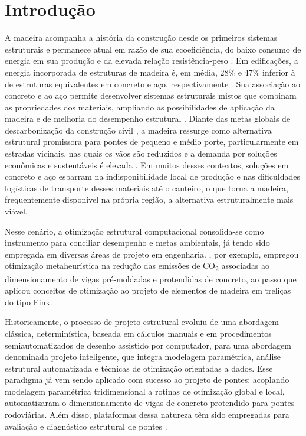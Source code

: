 \section{Introdução}\label{sec:introducao}

A madeira acompanha a história da construção desde os primeiros sistemas estruturais e permanece atual em razão de sua ecoeficiência, do baixo consumo de energia em sua produção e da elevada relação resistência-peso \parencite{FRAGA2025}.
Em edificações, a energia incorporada de estruturas de madeira é, em média, 28\% e 47\% inferior à de estruturas equivalentes em concreto e aço, respectivamente \parencite{Schenk2022}.
Sua associação ao concreto e ao aço permite desenvolver sistemas estruturais mistos que combinam as propriedades dos materiais, ampliando as possibilidades de aplicação da madeira e de melhoria do desempenho estrutural \parencite{PASTORI2022}.
Diante das metas globais de descarbonização da construção civil \parencite{Li2025}, a madeira ressurge como alternativa estrutural promissora para pontes de pequeno e médio porte, particularmente em estradas vicinais, nas quais os vãos são reduzidos e a demanda por soluções econômicas e sustentáveis é elevada \parencite{Milani2020}.
Em muitos desses contextos, soluções em concreto e aço esbarram na indisponibilidade local de produção e nas dificuldades logísticas de transporte desses materiais até o canteiro, o que torna a madeira, frequentemente disponível na própria região, a alternativa estruturalmente mais viável.

Nesse cenário, a otimização estrutural computacional consolida-se como instrumento para conciliar desempenho e metas ambientais, já tendo sido empregada em diversas áreas de projeto em engenharia. \textcite{Moraes2022}, por exemplo, empregou otimização metaheurística na redução das emissões de CO\textsubscript{2} associadas ao dimensionamento de vigas pré-moldadas e protendidas de concreto, ao passo que \textcite{FRAGA2025} aplicou conceitos de otimização ao projeto de elementos de madeira em treliças do tipo Fink.

Historicamente, o processo de projeto estrutural evoluiu de uma abordagem clássica, determinística, baseada em cálculos manuais e em procedimentos semiautomatizados de desenho assistido por computador, para uma abordagem denominada projeto inteligente, que integra modelagem paramétrica, análise estrutural automatizada e técnicas de otimização orientadas a dados.
Esse paradigma já vem sendo aplicado com sucesso ao projeto de pontes: acoplando modelagem paramétrica tridimensional a rotinas de otimização global e local, \textcite{deMoraes2025} automatizaram o dimensionamento de vigas de concreto protendido para pontes rodoviárias.
Além disso, plataformas dessa natureza têm sido empregadas para avaliação e diagnóstico estrutural de pontes \parencite{Garbowski2023, Alseid2025, Miluccio2026}.

